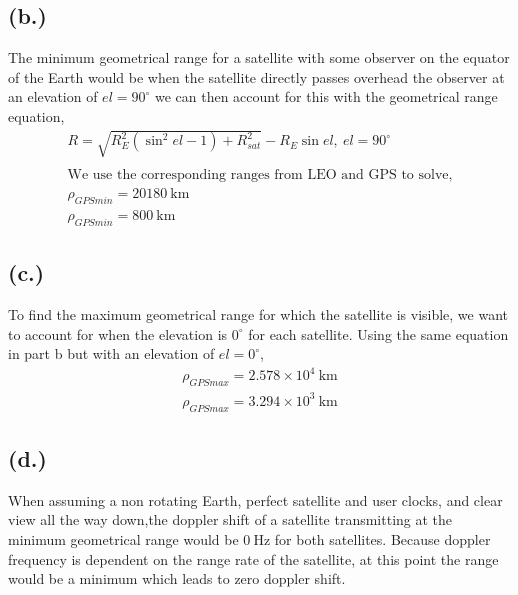 \documentclass[11pt]{article}
\begin{document}
\subsection*{(b.)}
\hspace*{2em}The minimum geometrical range for a satellite with some observer on the equator of the Earth would be when the satellite directly passes overhead the observer at an elevation of $el = 90^\circ$ we can then account for this with the geometrical range equation,
\begin{gather*}
R = \sqrt{R_E^2(\sin^2{el-1}) + R_{sat}^2} - R_E \sin{el},~el=90^\circ \\
\\
\text{We use the corresponding ranges from LEO and GPS to solve,} \\
\boxed{\rho_{GPS min} = 20180~\mathrm{km}} \\
\boxed{\rho_{GPS min} = 800~\mathrm{km}}
\end{gather*}

\subsection*{(c.)}
\hspace*{2em}To find the maximum geometrical range for which the satellite is visible, we want to account for when the elevation is $0^\circ$ for each satellite. Using the same equation in part b but with an elevation of $el=0^\circ$,
\begin{gather*}
\boxed{\rho_{GPS max} = 2.578\times10^4~\mathrm{km}} \\
\boxed{\rho_{GPS max} = 3.294\times10^3~\mathrm{km}}
\end{gather*}

\subsection*{(d.)}
\hspace*{2em}When assuming a non rotating Earth, perfect satellite and user clocks, and clear view all the way down,the doppler shift of a satellite transmitting at the minimum geometrical range would be $0~\mathrm{Hz}$ for both satellites. Because doppler frequency is dependent on the range rate of the satellite, at this point the range would be a minimum which leads to zero doppler shift.  
\end{document}
